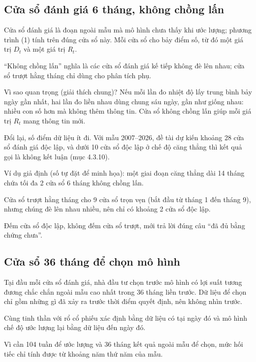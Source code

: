 \subsection{Cửa sổ đánh giá 6 tháng, không chồng lấn}

Cửa sổ đánh giá là đoạn ngoài mẫu mà mô hình chưa thấy khi ước lượng; phương trình (1) tính trên đúng cửa sổ này. Mỗi cửa sổ cho bảy điểm số, từ đó một giá trị \(D_{t}\) và một giá trị \(R_{t}\).

“Không chồng lấn” nghĩa là các cửa sổ đánh giá kế tiếp không đè lên nhau; cửa sổ trượt hằng tháng chỉ dùng cho phân tích phụ.

Vì sao quan trọng (giải thích chung)? Nếu mỗi lần đo nhiệt độ lấy trung bình bảy ngày gần nhất, hai lần đo liền nhau dùng chung sáu ngày, gần như giống nhau: nhiều con số hơn mà không thêm thông tin. Cửa sổ không chồng lấn giúp mỗi giá trị \(R_{t}\) mang thông tin mới.

Đổi lại, số điểm dữ liệu ít đi. Với mẫu 2007--2026, đề tài dự kiến khoảng 28 cửa sổ đánh giá độc lập, và dưới 10 cửa sổ độc lập ở chế độ căng thẳng thì kết quả gọi là không kết luận (mục 4.3.10).

\begin{tcolorbox}[breakable]
Ví dụ giả định (số tự đặt để minh họa): một giai đoạn căng thẳng dài 14 tháng chứa tối đa 2 cửa sổ 6 tháng không chồng lấn.

Cửa sổ trượt hằng tháng cho 9 cửa sổ trọn vẹn (bắt đầu từ tháng 1 đến tháng 9), nhưng chúng đè lên nhau nhiều, nên chỉ có khoảng 2 cửa sổ độc lập.

Đếm cửa sổ độc lập, không đếm cửa sổ trượt, mới trả lời đúng câu “đã đủ bằng chứng chưa”.
\end{tcolorbox}

\subsection{Cửa sổ 36 tháng để chọn mô hình}

Tại đầu mỗi cửa sổ đánh giá, nhà đầu tư chọn trước mô hình có lợi suất tương đương chắc chắn ngoài mẫu cao nhất trong 36 tháng liền trước. Dữ liệu để chọn chỉ gồm những gì đã xảy ra trước thời điểm quyết định, nên không nhìn trước.

Cùng tinh thần với rổ cổ phiếu xác định bằng dữ liệu có tại ngày đó và mô hình chế độ ước lượng lại bằng dữ liệu đến ngày đó.

Vì cần 104 tuần để ước lượng và 36 tháng kết quả ngoài mẫu để chọn, mức hối tiếc chỉ tính được từ khoảng năm thứ năm của mẫu.

